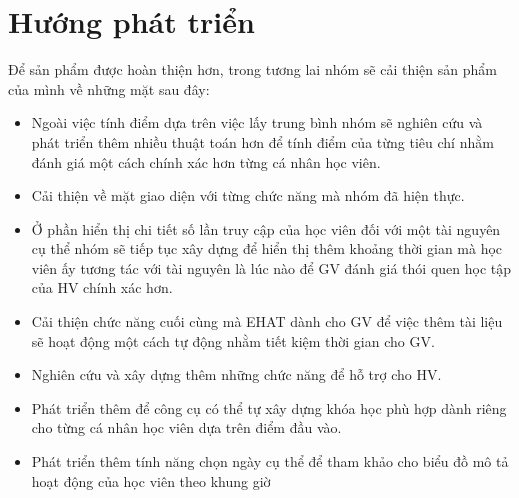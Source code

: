 \section{Hướng phát triển}

Để sản phẩm được hoàn thiện hơn, trong tương lai nhóm sẽ cải thiện sản phẩm của mình về những mặt sau đây:

\begin{itemize}
	\item Ngoài việc tính điểm dựa trên việc lấy trung bình nhóm sẽ nghiên cứu và phát triển thêm nhiều thuật toán hơn để tính điểm của từng tiêu chí nhằm đánh giá một cách chính xác hơn từng cá nhân học viên.
	
	\item Cải thiện về mặt giao diện với từng chức năng mà nhóm đã hiện thực.
	
	\item Ở phần hiển thị chi tiết số lần truy cập của học viên đối với một tài nguyên cụ thể nhóm sẽ tiếp tục xây dựng để hiển thị thêm khoảng thời gian mà học viên ấy tương tác với tài nguyên là lúc nào để GV đánh giá thói quen học tập của HV chính xác hơn.
	
	\item Cải thiện chức năng cuối cùng mà EHAT dành cho GV để việc thêm tài liệu sẽ hoạt động một cách tự động nhằm tiết kiệm thời gian cho GV.
	
	\item Nghiên cứu và xây dựng thêm những chức năng để hỗ trợ cho HV.
	
	\item Phát triển thêm để công cụ có thể tự xây dựng khóa học phù hợp dành riêng cho từng cá nhân học viên dựa trên điểm đầu vào.
	
	\item Phát triển thêm tính năng chọn ngày cụ thể để tham khảo cho biểu đồ mô tả hoạt động của học viên theo khung giờ
\end{itemize}